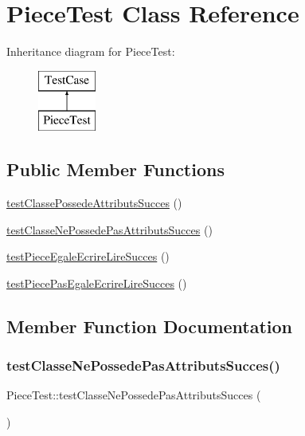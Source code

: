 \hypertarget{class_piece_test}{}\section{Piece\+Test Class Reference}
\label{class_piece_test}
Inheritance diagram for Piece\+Test\+:\begin{figure}[H]
\begin{center}
\leavevmode
\includegraphics[height=2.000000cm]{class_piece_test}
\end{center}
\end{figure}
\subsection*{Public Member Functions}
\begin{DoxyCompactItemize}
\item 
\hyperlink{class_piece_test_a31a6ccad0ee557f891cdce22c59d0fbb}{test\+Classe\+Possede\+Attributs\+Succes} ()
\item 
\hyperlink{class_piece_test_ab78ee6208b1c0806c8336dcc35962367}{test\+Classe\+Ne\+Possede\+Pas\+Attributs\+Succes} ()
\item 
\hyperlink{class_piece_test_a45f277f78743fd128acdfe313842526e}{test\+Piece\+Egale\+Ecrire\+Lire\+Succes} ()
\item 
\hyperlink{class_piece_test_afdda3ae8c1e0ed57506d7f17828c2662}{test\+Piece\+Pas\+Egale\+Ecrire\+Lire\+Succes} ()
\end{DoxyCompactItemize}


\subsection{Member Function Documentation}
\mbox{\label{class_piece_test_ab78ee6208b1c0806c8336dcc35962367}} 
\subsubsection{\texorpdfstring{test\+Classe\+Ne\+Possede\+Pas\+Attributs\+Succes()}{testClasseNePossedePasAttributsSucces()}}
{\footnotesize\ttfamily Piece\+Test\+::test\+Classe\+Ne\+Possede\+Pas\+Attributs\+Succes (\begin{DoxyParamCaption}{ }\end{DoxyParamCaption})}

